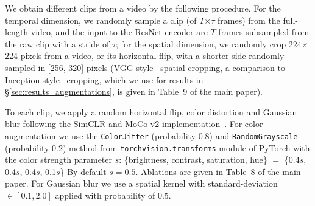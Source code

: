 \documentclass[final]{cvpr}
\def\x{$\times$}
\begin{document}
We obtain different clips from a video by the following procedure.
For the temporal dimension, we randomly sample a clip (of $T$\x$\tau$ frames) from the full-length video, and the input to the ResNet encoder are $T$ frames subsampled from the raw clip with a stride of $\tau$; for the spatial dimension, we randomly crop 224\x224 pixels from a video, or its horizontal flip, with a shorter side randomly sampled in [256, 320] pixels \cite{Feichtenhofer19} (VGG-style~\cite{Simonyan15,He16} spatial cropping, a comparison to Inception-style~\cite{Szegedy15} cropping, which we use for results in \S\ref{sec:results_augmentations},  is given in Table~{\color{red}9} of the main paper). 

To each clip, we apply a random horizontal flip, color distortion and Gaussian blur following the SimCLR and MoCo v2 implementation~\cite{Chen20,Chen20moco}.
For color augmentation we use the \texttt{ColorJitter} (probability $0.8$) and \texttt{RandomGrayscale} (probability $0.2$) method from \texttt{torchvision.transforms} module of PyTorch with the color strength parameter $s$: \{brightness, contrast, saturation, hue\} $=$ \{0.4$s$, 0.4$s$, 0.4$s$, 0.1$s$\} By default $s{=}0.5$. Ablations are given in Table~{\color{red}8} of the main paper. For Gaussian blur we use a spatial kernel with standard-deviation $\in [0.1, 2.0]$ applied with probability of $0.5$.

\newcommand{\blocks}[3]{\multirow{3}{*}{\(\left[\begin{array}{c}\text{1$\times$1$^\text{2}$, #2}\\[-.1em] \text{1$\times$3$^\text{2}$, #2}\\[-.1em] \text{1$\times$1$^\text{2}$, #1}\end{array}\right]\)$\times$#3}
}
\newcommand{\blockt}[3]{\multirow{3}{*}{\(\left[\begin{array}{c}\text{\underline{3$\times$1$^\text{2}$}, #2}\\[-.1em] \text{1$\times$3$^\text{2}$, #2}\\[-.1em] \text{1$\times$1$^\text{2}$, #1}\end{array}\right]\)$\times$#3}
}
\newcommand{\outsizes}[7]{\multirow{#7}{*}{\(\begin{array}{c} \text{\emph{Slow}}: \text{#1$\times$#2$^\text{2}$}\\[-.1em] \text{\emph{Fast}}: \text{#4$\times$#5$^\text{2}$}\end{array}\)}
}
\newcommand{\outsizesRaw}[4]{\multirow{#4}{*}{\(\begin{array}{c}  \text{#1$\times$#2$^2$}\\[-.1em]  \end{array}\)}}
\end{document}
